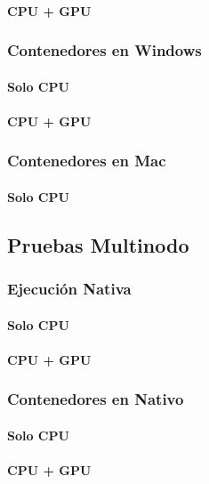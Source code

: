 \paragraph{CPU + GPU}

\subsubsection{Contenedores en Windows}
\paragraph{Solo CPU}

\paragraph{CPU + GPU}

\subsubsection{Contenedores en Mac}
\paragraph{Solo CPU}

\subsection{Pruebas Multinodo}
\subsubsection{Ejecución Nativa}
\paragraph{Solo CPU}

\paragraph{CPU + GPU}

\subsubsection{Contenedores en Nativo}
\paragraph{Solo CPU}

\paragraph{CPU + GPU}


